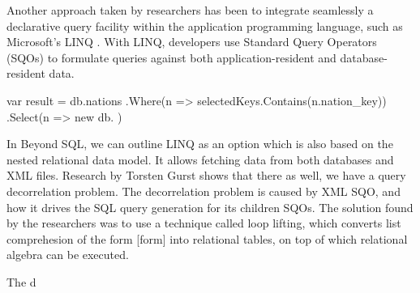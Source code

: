 Another approach taken by researchers has been to integrate seamlessly a declarative query facility within the application programming language, such as Microsoft's LINQ \cite{LINQ}. With LINQ, developers use Standard Query Operators (SQOs) to formulate queries against both application-resident and database-resident data. 

\begin{Java}[basicstyle=\small, language=C#]
var result = db.nations
	.Where(n => selectedKeys.Contains(n.nation_key))
	.Select(n => new {
		db.
	})
\end{Java}

In Beyond SQL, we can outline LINQ as an option which is also based on the nested relational data model. It allows fetching data from both databases and XML files. Research by Torsten Gurst shows that there as well, we have a query decorrelation problem. The decorrelation problem is caused by XML SQO, and how it drives the SQL query generation for its children SQOs. The solution found by the researchers was to use a technique called loop lifting, which converts list comprehesion of the form [form] into relational tables, on top of which relational algebra can be executed.


The d

